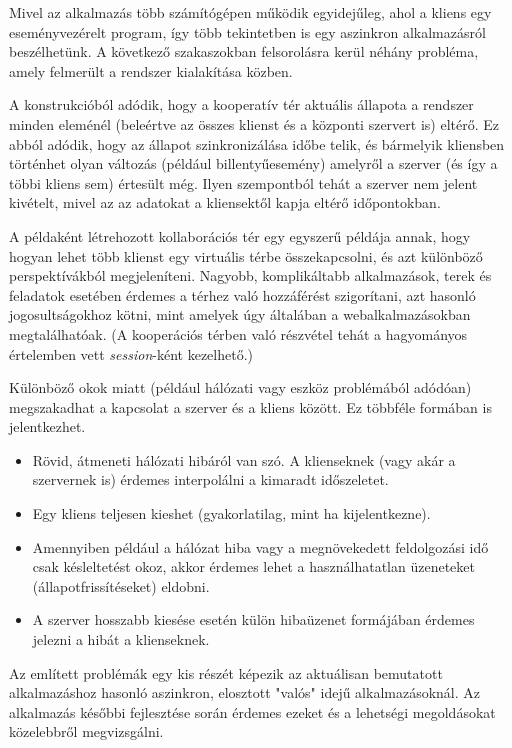 
Mivel az alkalmazás több számítógépen működik egyidejűleg, ahol a kliens egy eseményvezérelt program, így több tekintetben is egy aszinkron alkalmazásról beszélhetünk.
A következő szakaszokban felsorolásra kerül néhány probléma, amely felmerült a rendszer kialakítása közben.


A konstrukcióból adódik, hogy a kooperatív tér aktuális állapota a rendszer minden eleménél (beleértve az összes klienst és a központi szervert is) eltérő.
Ez abból adódik, hogy az állapot szinkronizálása időbe telik, és bármelyik kliensben történhet olyan változás (például billentyűesemény) amelyről a szerver (és így a többi kliens sem) értesült még.
Ilyen szempontból tehát a szerver nem jelent kivételt, mivel az az adatokat a kliensektől kapja eltérő időpontokban.


A példaként létrehozott kollaborációs tér egy egyszerű példája annak, hogy hogyan lehet több klienst egy virtuális térbe összekapcsolni, és azt különböző perspektívákból megjeleníteni.
Nagyobb, komplikáltabb alkalmazások, terek és feladatok esetében érdemes a térhez való hozzáférést szigorítani, azt hasonló jogosultságokhoz kötni, mint amelyek úgy általában a webalkalmazásokban megtalálhatóak.
(A kooperációs térben való részvétel tehát a hagyományos értelemben vett \textit{session}-ként kezelhető.)


Különböző okok miatt (például hálózati vagy eszköz problémából adódóan) megszakadhat a kapcsolat a szerver és a kliens között.
Ez többféle formában is jelentkezhet.
\begin{itemize}
	\item Rövid, átmeneti hálózati hibáról van szó. A klienseknek (vagy akár a szervernek is) érdemes interpolálni a kimaradt időszeletet.
	\item Egy kliens teljesen kieshet (gyakorlatilag, mint ha kijelentkezne).
	\item Amennyiben például a hálózat hiba vagy a megnövekedett feldolgozási idő csak késleltetést okoz, akkor érdemes lehet a használhatatlan üzeneteket (állapotfrissítéseket) eldobni.
	\item A szerver hosszabb kiesése esetén külön hibaüzenet formájában érdemes jelezni a hibát a klienseknek.
\end{itemize}

Az említett problémák egy kis részét képezik az aktuálisan bemutatott alkalmazáshoz hasonló aszinkron, elosztott "valós" idejű alkalmazásoknál.
Az alkalmazás későbbi fejlesztése során érdemes ezeket és a lehetségi megoldásokat közelebbről megvizsgálni.

